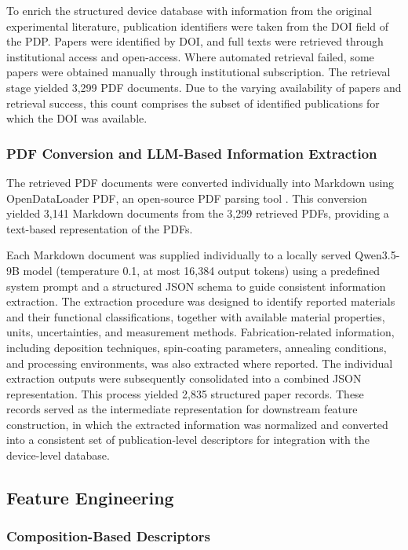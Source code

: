 \documentclass[3p]{elsarticle}
\begin{document}
To enrich the structured device database with information from the original experimental literature, publication identifiers were taken from the DOI field of the PDP. Papers were identified by DOI, and full texts were retrieved through institutional access and open-access. Where automated retrieval failed, some papers were obtained manually through institutional subscription. The retrieval stage yielded 3,299 PDF documents. Due to the varying availability of papers and retrieval success, this count comprises the subset of identified publications for which the DOI was available.

\subsubsection{PDF Conversion and LLM-Based Information Extraction}
\label{sec:extraction}

The retrieved PDF documents were converted individually into Markdown using OpenDataLoader PDF, an open-source PDF parsing tool \cite{opendataloaderpdf}. This conversion yielded 3,141 Markdown documents from the 3,299 retrieved PDFs, providing a text-based representation of the PDFs.

Each Markdown document was supplied individually to a locally served Qwen3.5-9B model (temperature 0.1, at most 16,384 output tokens) using a predefined system prompt and a structured JSON schema to guide consistent information extraction. The extraction procedure was designed to identify reported materials and their functional classifications, together with available material properties, units, uncertainties, and measurement methods. Fabrication-related information, including deposition techniques, spin-coating parameters, annealing conditions, and processing environments, was also extracted where reported. The individual extraction outputs were subsequently consolidated into a combined JSON representation. This process yielded 2,835 structured paper records. These records served as the intermediate representation for downstream feature construction, in which the extracted information was normalized and converted into a consistent set of publication-level descriptors for integration with the device-level database.

\subsection{Feature Engineering}

\subsubsection{Composition-Based Descriptors}
\end{document}
